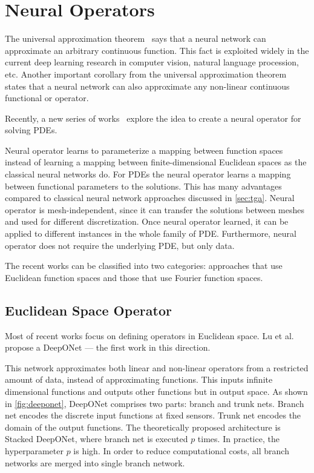 \section{Neural Operators}
\label{sec:neuraloperators}
The universal approximation theorem~\cite{universalT} says that a neural network can approximate an arbitrary continuous function. This fact is exploited widely in the current deep learning research in computer vision, natural language procession, etc. Another important corollary from the universal approximation theorem states that a neural network can also approximate any non-linear continuous functional or operator.

Recently, a new series of works~\cite{deeponet, bhattacharya21, nelsen21, Li20} explore the idea to create a neural operator for solving PDEs. 

Neural operator learns to parameterize a mapping between function spaces instead of learning a mapping between finite-dimensional Euclidean spaces as the classical neural networks do. For PDEs the neural operator learns a mapping between functional parameters to the solutions. This has many advantages compared to classical neural network approaches discussed in \cref{sec:tga}. Neural operator is mesh-independent, since it can transfer the solutions between meshes and used for different discretization. Once neural operator learned, it can be applied to different instances in the whole family of PDE. Furthermore, neural operator does not require the underlying PDE, but only data. 

The recent works can be classified into two categories: approaches that use Euclidean function spaces and those that use Fourier function spaces. 

\subsection{Euclidean Space Operator}
Most of recent works \cite{deeponet, bhattacharya21, nelsen21} focus on defining operators in Euclidean space. Lu et al.~\cite{deeponet} propose a DeepONet --- the first work in this direction. 

This network approximates both linear and non-linear operators from a restricted amount of data, instead of approximating functions. This inputs infinite dimensional functions and outputs other functions but in output space. As shown in \cref{fig:deeponet}, DeepONet comprises two parts: branch and trunk nets. Branch net encodes the discrete input functions at fixed sensors. Trunk net encodes the domain of the output functions. The theoretically proposed architecture is Stacked DeepONet, where branch net is executed $p$ times. In practice, the hyperparameter $p$ is high. In order to reduce computational costs, all branch networks are merged into single branch network.

